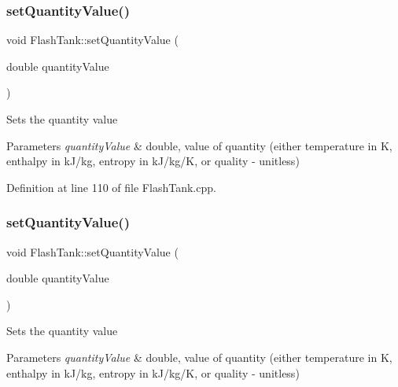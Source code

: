 \subsubsection{\texorpdfstring{set\+Quantity\+Value()}{setQuantityValue()}\hspace{0.1cm}{\footnotesize\ttfamily [1/3]}}
{\footnotesize\ttfamily void Flash\+Tank\+::set\+Quantity\+Value (\begin{DoxyParamCaption}\item[{double}]{quantity\+Value }\end{DoxyParamCaption})}

Sets the quantity value 
\begin{DoxyParams}{Parameters}
{\em quantity\+Value} & double, value of quantity (either temperature in K, enthalpy in k\+J/kg, entropy in k\+J/kg/K, or quality -\/ unitless) \\
\hline
\end{DoxyParams}


Definition at line 110 of file Flash\+Tank.\+cpp.

\mbox{\label{class_flash_tank_ac7392743aeaf8de6ce368814ea42e236}} 
\subsubsection{\texorpdfstring{set\+Quantity\+Value()}{setQuantityValue()}\hspace{0.1cm}{\footnotesize\ttfamily [2/3]}}
{\footnotesize\ttfamily void Flash\+Tank\+::set\+Quantity\+Value (\begin{DoxyParamCaption}\item[{double}]{quantity\+Value }\end{DoxyParamCaption})}

Sets the quantity value 
\begin{DoxyParams}{Parameters}
{\em quantity\+Value} & double, value of quantity (either temperature in K, enthalpy in k\+J/kg, entropy in k\+J/kg/K, or quality -\/ unitless) \\
\hline
\end{DoxyParams}
\mbox{\label{class_flash_tank_ac7392743aeaf8de6ce368814ea42e236}} 
